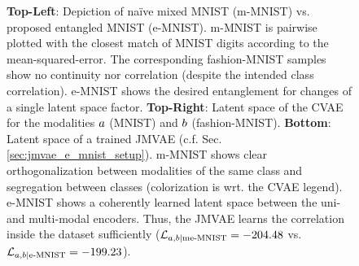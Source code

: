 %
%
%
%
%
%
%
%
%
\begin{figure}[h]
	\footnotesize
	\begin{center}
		
	\end{center}
	\caption{\textbf{Top-Left}: Depiction of na\"ive mixed MNIST (m-MNIST) vs. proposed entangled MNIST (e-MNIST).
		m-MNIST is pairwise plotted with the closest match of MNIST digits according to the mean-squared-error.
		The corresponding fashion-MNIST samples show no continuity nor correlation (despite the intended class correlation).
		e-MNIST shows the desired entanglement for changes of a single latent space factor.
		\textbf{Top-Right}: Latent space of the CVAE for the modalities $a$ (MNIST) and $b$ (fashion-MNIST).
		\textbf{Bottom}: Latent space of a trained JMVAE (c.f. Sec. \ref{sec:jmvae_e_mnist_setup}).
		m-MNIST shows clear orthogonalization between modalities of the same class and segregation between classes (colorization is wrt. the CVAE legend).
		e-MNIST shows a coherently learned latent space between the uni- and multi-modal encoders.
		Thus, the JMVAE learns the correlation inside the dataset sufficiently ($\mathcal{L}_{a,b|\text{me-MNIST}} = -204.48$ vs. $\mathcal{L}_{a,b|\text{e-MNIST}} = -199.23$).
		}
	\label{fig:e_mnist}
\end{figure} 


